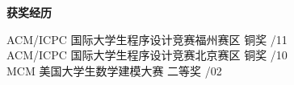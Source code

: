 \documentclass[a4paper]{article}
\newenvironment{changemargin}[2]{%
  \begin{list}{}{%
    \setlength{\topsep}{0pt}%
    \setlength{\leftmargin}{#1}%
    \setlength{\rightmargin}{#2}%
    \setlength{\listparindent}{\parindent}%
    \setlength{\itemindent}{\parindent}%
    \setlength{\parsep}{\parskip}%
  }%
  \item[]}{\end{list}
}
\newcommand{\lineover}{
	\begin{changemargin}{-0.05in}{-0.05in}
		\vspace*{-8pt}
		\hrulefill \\
		\vspace*{-2pt}
	\end{changemargin}
}
\newcommand{\header}[1]{
	\begin{changemargin}{-0.5in}{-0.5in}
	\fontsize{12}{14} \scshape{\textbf{#1}}\\
	\end{changemargin}
}
\newenvironment{body} {
	\vspace*{-16pt}
	\begin{changemargin}{-0.5in}{-0.5in}
  }	
	{\end{changemargin}
}
\begin{document}
\medskip




\header{获奖经历}
\begin{body}
	\vspace{14pt}
	{{\fontarial ACM/ICPC} 国际大学生程序设计竞赛福州赛区 铜奖} \hfill {/11}\\
	{{\fontarial ACM/ICPC} 国际大学生程序设计竞赛北京赛区 铜奖} \hfill {/10}\\
	{{\fontarial MCM} 美国大学生数学建模大赛 二等奖} \hfill {/02}\\
\end{body}

\medskip
\end{document}
